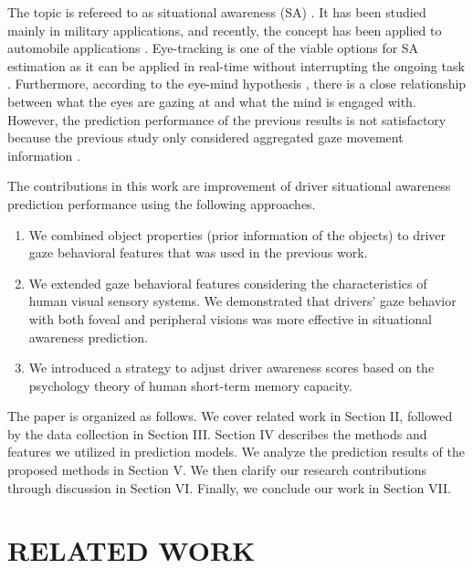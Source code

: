 \documentclass[letterpaper, 10 pt, conference]{ieeeconf}  %
\begin{document}
The topic is refereed to as situational awareness (SA) \cite{endsley1988design, endsley1995toward}. It has been studied mainly in military applications, and recently, the concept has been applied to automobile applications \cite{endsley2016designing}. Eye-tracking is one of the viable options for SA estimation as it can be applied in real-time without interrupting the ongoing task \cite{moore2010development}. Furthermore, according to the eye-mind hypothesis \cite{just1980theory}, there is a close relationship between what the eyes are gazing at and what the mind is engaged with. However, the prediction performance of the previous results is not satisfactory because the previous study only considered aggregated gaze movement information \cite{kim2020toward}.

The contributions in this work are improvement of driver situational awareness prediction performance using the following approaches.
\begin{enumerate}
    \item We combined object properties (prior information of the objects) to driver gaze behavioral features that was used in the previous work.
    \item We extended gaze behavioral features considering the characteristics of human visual sensory systems. We demonstrated that drivers' gaze behavior with both foveal and peripheral visions was more effective in situational awareness prediction.
    \item We introduced a strategy to adjust driver awareness scores based on the psychology theory of human short-term memory capacity.
\end{enumerate}

The paper is organized as follows. We cover related work in Section II, followed by the data collection in Section III. Section IV describes the methods and features we utilized in prediction models. We analyze the prediction results of the proposed methods in Section V. We then clarify our research contributions through discussion in Section VI. Finally, we conclude our work in Section VII.


\section{RELATED WORK}

\end{document}
